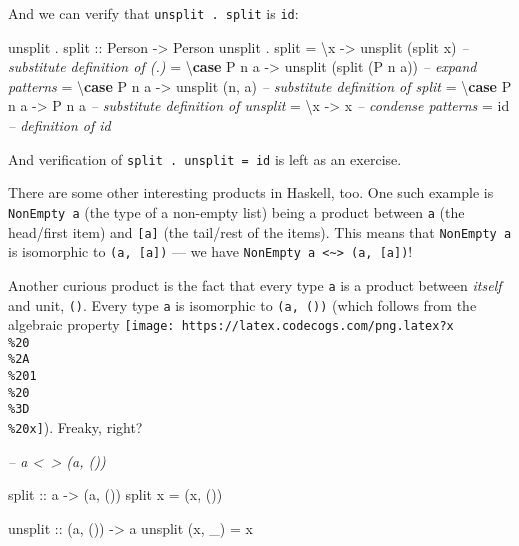 \documentclass[]{article}
\newenvironment{Shaded}{}{}
\newcommand{\CommentTok}[1]{\textcolor[rgb]{0.38,0.63,0.69}{\textit{#1}}}
\newcommand{\DataTypeTok}[1]{\textcolor[rgb]{0.56,0.13,0.00}{#1}}
\newcommand{\FunctionTok}[1]{\textcolor[rgb]{0.02,0.16,0.49}{#1}}
\newcommand{\KeywordTok}[1]{\textcolor[rgb]{0.00,0.44,0.13}{\textbf{#1}}}
\newcommand{\NormalTok}[1]{#1}
\newcommand{\OtherTok}[1]{\textcolor[rgb]{0.00,0.44,0.13}{#1}}
\begin{document}
And we can verify that \texttt{unsplit\ .\ split} is \texttt{id}:

\begin{Shaded}
\begin{Highlighting}[]
\NormalTok{unsplit }\FunctionTok{.}\OtherTok{ split ::} \DataTypeTok{Person} \OtherTok{->} \DataTypeTok{Person}
\NormalTok{unsplit }\FunctionTok{.}\NormalTok{ split}
    \FunctionTok{=}\NormalTok{ \textbackslash{}x          }\OtherTok{->}\NormalTok{ unsplit (split x)        }\CommentTok{-- substitute definition of (.)}
    \FunctionTok{=}\NormalTok{ \textbackslash{}}\KeywordTok{case} \DataTypeTok{P}\NormalTok{ n a }\OtherTok{->}\NormalTok{ unsplit (split (}\DataTypeTok{P}\NormalTok{ n a))  }\CommentTok{-- expand patterns}
    \FunctionTok{=}\NormalTok{ \textbackslash{}}\KeywordTok{case} \DataTypeTok{P}\NormalTok{ n a }\OtherTok{->}\NormalTok{ unsplit (n, a)           }\CommentTok{-- substitute definition of split}
    \FunctionTok{=}\NormalTok{ \textbackslash{}}\KeywordTok{case} \DataTypeTok{P}\NormalTok{ n a }\OtherTok{->} \DataTypeTok{P}\NormalTok{ n a                    }\CommentTok{-- substitute definition of unsplit}
    \FunctionTok{=}\NormalTok{ \textbackslash{}x      }\OtherTok{->}\NormalTok{ x                            }\CommentTok{-- condense patterns}
    \FunctionTok{=}\NormalTok{ id                                      }\CommentTok{-- definition of id}
\end{Highlighting}
\end{Shaded}

And verification of \texttt{split\ .\ unsplit\ =\ id} is left as an exercise.

There are some other interesting products in Haskell, too. One such example is
\texttt{NonEmpty\ a} (the type of a non-empty list) being a product between
\texttt{a} (the head/first item) and \texttt{{[}a{]}} (the tail/rest of the
items). This means that \texttt{NonEmpty\ a} is isomorphic to
\texttt{(a,\ {[}a{]})} --- we have
\texttt{NonEmpty\ a\ \textless{}\textasciitilde{}\textgreater{}\ (a,\ {[}a{]})}!

Another curious product is the fact that every type \texttt{a} is a product
between \emph{itself} and unit, \texttt{()}. Every type \texttt{a} is isomorphic
to \texttt{(a,\ ())} (which follows from the algebraic property
\texttt{[image: https://latex.codecogs.com/png.latex?x\\\%20\\\%2A\\\%201\\\%20\\\%3D\\\%20x]}).
Freaky, right?

\begin{Shaded}
\begin{Highlighting}[]
\CommentTok{-- a <~> (a, ())}

\OtherTok{split ::}\NormalTok{ a }\OtherTok{->}\NormalTok{ (a, ())}
\NormalTok{split x }\FunctionTok{=}\NormalTok{ (x, ())}

\OtherTok{unsplit ::}\NormalTok{ (a, ()) }\OtherTok{->}\NormalTok{ a}
\NormalTok{unsplit (x, _) }\FunctionTok{=}\NormalTok{ x}
\end{Highlighting}
\end{Shaded}
\end{document}
